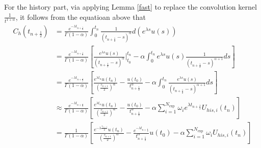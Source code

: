\documentclass[10pt, reqno]{amsart}
\theoremstyle{remark}
\theoremstyle{definition}
\numberwithin{table}{section}
\begin{document}
For the history part,  via applying Lemma \ref{fast} to replace the convolution kernel $\frac{1}{t^{1+\alpha}}$,  it follows from the equatioan above that
\begin{equation}
\begin{aligned}\label{Ch}
C_h\left(t_{n+\frac{1}{2}}\right) & =\frac{e^{-\lambda t_{n+\frac{1}{2}}}}{\Gamma(1-\alpha)} \int_0^{t_{n}} \frac{1}{\left(t_{n+\frac{1}{2}}-s\right)^\alpha} d\left(e^{\lambda s} u(s)\right) \\
& =\frac{e^{-\lambda t_{n+\frac{1}{2}}}}{\Gamma(1-\alpha)}\left[\frac{e^{\lambda s} u(s)}{\left(t_{n+\frac{1}{2}}-s\right)^\alpha} |_{t_0}^{t_{n}}-\alpha \int_0^{t_{n}} e^{\lambda s} u(s) \frac{1}{\left(t_{n+\frac{1}{2}}-s\right)^{\alpha+1}} d s\right] \\
& =\frac{e^{-\lambda t_{n+\frac{1}{2}}}}{\Gamma(1-\alpha)}\left[\frac{e^{\lambda t_{n}} u\left(t_{n}\right)}{(\frac{\tau_{n+1}}{2})^\alpha}-\frac{u\left(t_0\right)}{t_{n+\frac{1}{2}}^\alpha}-\alpha \int_0^{t_{n}} \frac{e^{\lambda s} u(s)}{\left(t_{n+\frac{1}{2}}-s\right)^{\alpha+1}} d s\right] \\
& \approx \frac{e^{-\lambda t_{n+\frac{1}{2}}}}{\Gamma(1-\alpha)}\left[\frac{e^{\lambda t_{n}} u\left(t_{n}\right)}{(\frac{\tau_{n+1}}{2})^\alpha}-\frac{u\left(t_0\right)}{t_{n+\frac{1}{2}}^\alpha}-\alpha \sum_{i=1}^{N_{\text {exp }}} \omega_i e^{\lambda t_{n+\frac{1}{2}}} U_{h i s,  i}\left(t_n\right)\right] \\
& =\frac{1}{\Gamma(1-\alpha)}\left[\frac{e^{-\lambda \frac{\tau_{n+1}}{2}} u\left(t_{n}\right)}{(\frac{\tau_{n+1}}{2})^\alpha}-\frac{e^{-\lambda t_{n+\frac{1}{2}}}}{t_{n+\frac{1}{2}}^\alpha} u\left(t_0\right)-\alpha \sum_{i=1}^{N_{\text {exp }}} \omega_i U_{h i s,  i}\left(t_n\right)\right]
\end{aligned}
\end{equation}
\end{document}
